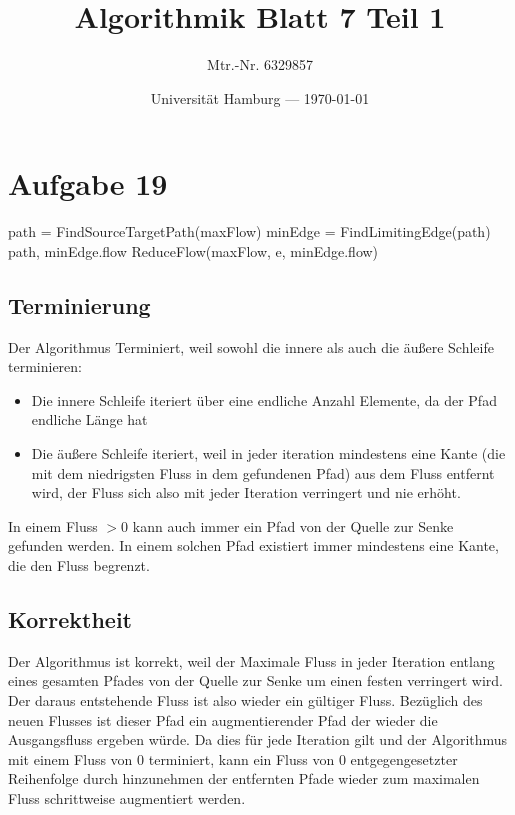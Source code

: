 \documentclass[parskip=half,a4paper]{scrartcl}
\title{Algorithmik Blatt 7 Teil 1}
\author{Mtr.-Nr. 6329857}
\date{Universität Hamburg --- \today}
\begin{document}
\maketitle %

\linenumbers

\section*{Aufgabe 19}

\nolinenumbers
\begin{algorithmic}[1]
\State path = FindSourceTargetPath(maxFlow)
\State minEdge = FindLimitingEdge(path)
\Output path, minEdge.flow
\State ReduceFlow(maxFlow, e, minEdge.flow)
\EndForeach
\EndWhile
\EndProcedure
\end{algorithmic}
\linenumbers

\subsection*{Terminierung}


Der Algorithmus Terminiert, weil sowohl die innere als auch die äußere Schleife terminieren:

\begin{itemize}
    \item Die innere Schleife iteriert über eine endliche Anzahl Elemente, da der Pfad endliche Länge hat
    \item Die äußere Schleife iteriert, weil in jeder iteration mindestens eine Kante (die mit dem niedrigsten Fluss in dem gefundenen Pfad) aus dem Fluss entfernt wird, der Fluss sich also mit jeder Iteration verringert und nie erhöht.
\end{itemize}

In einem Fluss $>0$ kann auch immer ein Pfad von der Quelle zur Senke gefunden werden. In einem solchen Pfad existiert immer mindestens eine Kante, die den Fluss begrenzt.

\subsection*{Korrektheit}

Der Algorithmus ist korrekt, weil der Maximale Fluss in jeder Iteration entlang eines gesamten Pfades von der Quelle zur Senke um einen festen verringert wird. Der daraus entstehende Fluss ist also wieder ein gültiger Fluss. Bezüglich des neuen Flusses ist dieser Pfad ein augmentierender Pfad der wieder die Ausgangsfluss ergeben würde. Da dies für jede Iteration gilt und der Algorithmus mit einem Fluss von 0 terminiert, kann ein Fluss von 0 entgegengesetzter Reihenfolge durch hinzunehmen der entfernten Pfade wieder zum maximalen Fluss schrittweise augmentiert werden.
\end{document}
